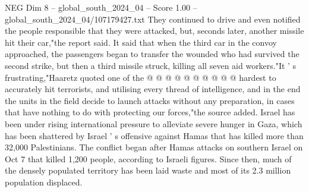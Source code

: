 \begin{textsample}{NEG Dim 8 – global\_south\_2024\_04 – Score 1.00 – global\_south\_2024\_04/107179427.txt}
They continued to drive and even notified the people responsible that they were attacked, but, seconds later, another missile hit their car,"the report said.
It said that when the third car in the convoy approached, the passengers began to transfer the wounded who had survived the second strike, but then a third missile struck, killing all seven aid workers."It ' s frustrating,"Haaretz quoted one of the @ @ @ @ @ @ @ @ @ @ hardest to accurately hit terrorists, and utilising every thread of intelligence, and in the end the units in the field decide to launch attacks without any preparation, in cases that have nothing to do with protecting our forces,"the source added.
Israel has been under rising international pressure to alleviate severe hunger in Gaza, which has been shattered by Israel ' s offensive against Hamas that has killed more than 32,000 Palestinians.
The conflict began after Hamas attacks on southern Israel on Oct 7 that killed 1,200 people, according to Israeli figures.
Since then, much of the densely populated territory has been laid waste and most of its 2.3 million population displaced.

\end{textsample}
